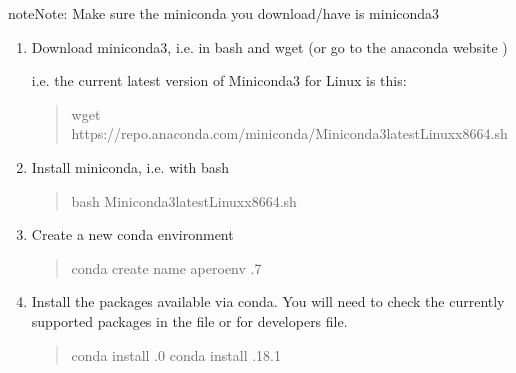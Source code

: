 \documentclass[a4paper,10pt,english]{report}
\begin{document}
\begin{sphinxadmonition}{note}{Note:}
Make sure the miniconda you download/have is miniconda3
\end{sphinxadmonition}
\begin{enumerate}
%
\item {} 
Download miniconda3, i.e. in bash and wget (or go to the
anaconda website )

i.e. the current latest version of Miniconda3 for Linux is this:
\begin{quote}

\begin{sphinxVerbatim}[commandchars=\\\{\}]
wget https://repo.anaconda.com/miniconda/Miniconda3\PYGZhy{}latest\PYGZhy{}Linux\PYGZhy{}x86\PYGZus{}64.sh
\end{sphinxVerbatim}
\end{quote}

\item {} 
Install miniconda, i.e. with bash
\begin{quote}

\begin{sphinxVerbatim}[commandchars=\\\{\}]
bash Miniconda3\PYGZhy{}latest\PYGZhy{}Linux\PYGZhy{}x86\PYGZus{}64.sh
\end{sphinxVerbatim}
\end{quote}

\item {} 
Create a new conda environment
\begin{quote}

\begin{sphinxVerbatim}[commandchars=\\\{\}]
conda create \PYGZhy{}\PYGZhy{}name apero\PYGZhy{}env .7
\end{sphinxVerbatim}
\end{quote}

\item {} 
Install the packages available via conda. You will need to check the
currently supported packages in the  file
or for developers  file.
\begin{quote}

\begin{sphinxVerbatim}[commandchars=\\\{\}]
conda install .0
conda install .18.1
\end{sphinxVerbatim}


\end{quote}
\end{enumerate}
\end{document}
